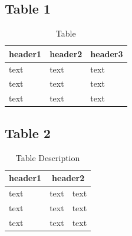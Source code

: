\subsection{Table 1}

\begin{table}[H]
\begin{center}
\begin{tabular}[c]{l l l}
\toprule
\textbf{header1} & \textbf{header2} & \textbf{header3}\\
\midrule
text & text & text \\
text & text & text \\
text & text & text \\
\bottomrule
\end{tabular}
\caption{Table}
\end{center}
\end{table}

\subsection{Table 2}

\begin{table}[H]                        
\begin{center}		                    %
\begin{tabular}[c]{|l|c|r|}             %

\hline                           %
\rowcolor{lightblue}
\textbf{header1} & \multicolumn{2}{c|}{\textbf{header2}}\\ %
\cline{2-3}
\hline \hline                           %
text & text & text\\          			%
\hline                                  %
text & text & text\\          			%
\hline                                  %
text & text & \cellcolor{yellow} text\\
\hline \hline                           %

\end{tabular}
\caption{Table Description}
\end{center}
\end{table}